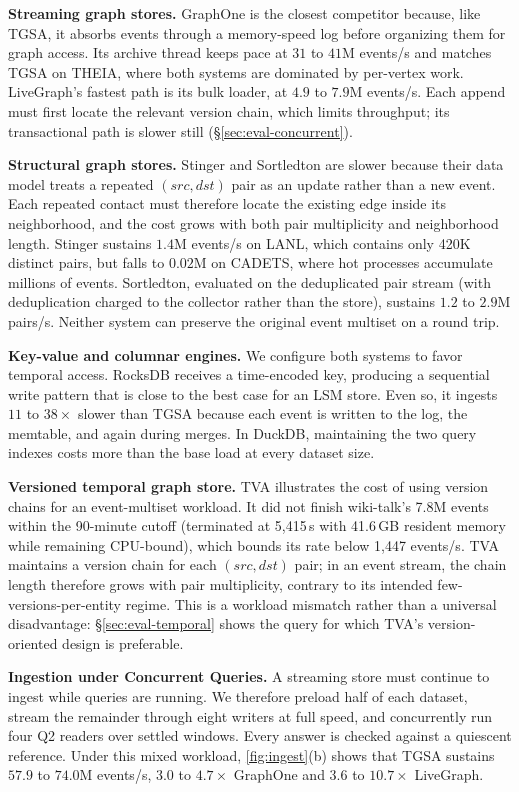 \documentclass[sigconf,nonacm]{acmart}
\newcommand{\sys}{TGSA\xspace}
\begin{document}
\textbf{Streaming graph stores.} GraphOne is the closest competitor
because, like \sys, it absorbs events through a memory-speed log before
organizing them for graph access. Its archive thread keeps pace at
$31$ to $41$M events/s and matches \sys on THEIA, where both systems
are dominated by per-vertex work. LiveGraph's fastest path is its bulk
loader, at $4.9$ to $7.9$M events/s. Each append must first locate the
relevant version chain, which limits throughput; its transactional path
is slower still (\S\ref{sec:eval-concurrent}).

\textbf{Structural graph stores.} Stinger and Sortledton are slower
because their data model treats a repeated $(src,dst)$ pair as an
update rather than a new event. Each repeated contact must therefore
locate the existing edge inside its neighborhood, and the cost grows
with both pair multiplicity and neighborhood length. Stinger sustains
$1.4$M events/s on LANL, which contains only 420K distinct pairs, but
falls to $0.02$M on CADETS, where hot processes accumulate millions
of events. Sortledton, evaluated on the deduplicated pair stream (with
deduplication charged to the collector rather than the store), sustains
$1.2$ to $2.9$M pairs/s. Neither system can preserve the original
event multiset on a round trip.

\textbf{Key-value and columnar engines.} We configure both systems to
favor temporal access. RocksDB receives a time-encoded key, producing
a sequential write pattern that is close to the best case for an LSM
store. Even so, it ingests $11$ to $38\times$ slower than \sys because
each event is written to the log, the memtable, and again during
merges. In DuckDB, maintaining the two query indexes costs more than
the base load at every dataset size.

\textbf{Versioned temporal graph store.} TVA illustrates the cost of
using version chains for an event-multiset workload. It did not finish
wiki-talk's 7.8M events within the 90-minute cutoff (terminated at
5{,}415\,s with 41.6\,GB resident memory while remaining CPU-bound),
which bounds its rate below 1{,}447 events/s. TVA maintains a version
chain for each $(src,dst)$ pair; in an event stream, the chain length
therefore grows with pair multiplicity, contrary to its intended
few-versions-per-entity regime. This is a workload mismatch rather
than a universal disadvantage: \S\ref{sec:eval-temporal} shows the
query for which TVA's version-oriented design is preferable.

\textbf{Ingestion under Concurrent Queries.}\label{sec:eval-concurrent}
A streaming store must continue to ingest while queries are running.
We therefore preload half of each dataset, stream the remainder through
eight writers at full speed, and concurrently run four Q2 readers over
settled windows. Every answer is checked against a quiescent reference.
Under this mixed workload, \cref{fig:ingest}(b) shows that \sys
sustains $57.9$ to $74.0$M events/s, $3.0$ to $4.7\times$ GraphOne and
$3.6$ to $10.7\times$ LiveGraph.
\end{document}
